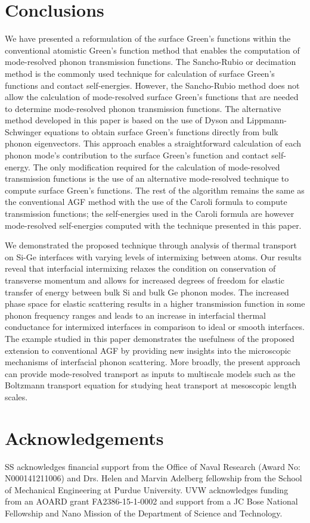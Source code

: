 \documentclass[11pt]{article}
\begin{document}
\section{Conclusions}
We have presented a reformulation of the surface Green's functions within the conventional atomistic Green's function method that enables the computation of mode-resolved phonon transmission functions. The Sancho-Rubio or decimation method is the commonly used technique for calculation of surface Green's functions and contact self-energies. However, the Sancho-Rubio method does not allow the calculation of mode-resolved surface Green's functions that are needed to determine mode-resolved phonon transmission functions. The alternative method developed in this paper is based on the use of Dyson and Lippmann-Schwinger equations to obtain surface Green's functions directly from bulk phonon eigenvectors. This approach enables a straightforward calculation of each phonon mode's contribution to the surface Green's function and contact self-energy. The only modification required for the calculation of mode-resolved transmission functions is the use of an alternative mode-resolved technique to compute surface Green's functions. The rest of the algorithm remains the same as the conventional AGF method with the use of the Caroli formula to compute transmission functions; the self-energies used in the Caroli formula are however mode-resolved self-energies computed with the technique presented in this paper. 

We demonstrated the proposed technique through analysis of thermal transport on Si-Ge interfaces with varying levels of intermixing between atoms. Our results reveal that interfacial intermixing relaxes the condition on conservation of transverse momentum and allows for increased degrees of freedom for elastic transfer of energy between bulk Si and bulk Ge phonon modes. The increased phase space for elastic scattering results in a higher transmission function in some phonon frequency ranges and leads to an increase in interfacial thermal conductance for intermixed interfaces in comparison to ideal or smooth interfaces. The example studied in this paper demonstrates the usefulness of the proposed extension to conventional AGF by providing new insights into the microscopic mechanisms of interfacial phonon scattering. More broadly, the present approach can provide mode-resolved transport as inputs to multiscale models such as the Boltzmann transport equation for studying heat transport at mesoscopic length scales. 
\section*{Acknowledgements}
SS acknowledges financial support from the Office of Naval Research (Award No: N000141211006) and Drs. Helen and Marvin Adelberg fellowship from the School of Mechanical Engineering at Purdue University. UVW acknowledges funding from an AOARD grant FA2386-15-1-0002 and support from a JC Bose National Fellowship and Nano Mission of the Department of Science and Technology.



%
\end{document}
